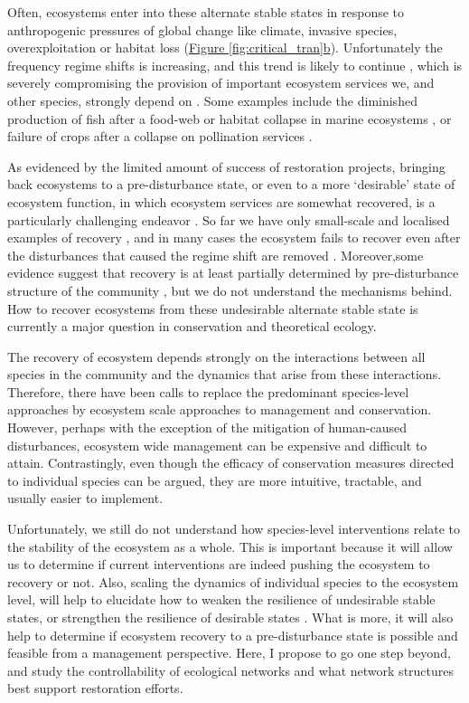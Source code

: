\documentclass[a4paper]{article}
\begin{document}
Often, ecosystems enter into these alternate stable states in response to anthropogenic pressures of global change like climate, invasive species, overexploitation or habitat loss (\hyperref[fig:critical_tran]{Figure \ref{fig:critical_tran}b}).
Unfortunately the frequency regime shifts is increasing, and this trend is likely to continue \autocite{Hughes2005}, which is severely compromising the provision of important ecosystem services we, and other species, strongly depend on \autocite{Hughes2013a}.
Some examples include the diminished production of fish after a food-web or habitat collapse in marine ecosystems \autocite{Hare2000, Daskalov2007, MacNeil2015}, or failure of crops after a collapse on pollination services \autocite{Pauw2007,Lever2014}.

As evidenced by the limited amount of success of restoration projects, bringing back ecosystems to a pre-disturbance state, or even to a more `desirable' state of ecosystem function, in which ecosystem services are somewhat recovered, is a particularly challenging endeavor \autocite{Graham2013a}.
So far we have only small-scale and localised examples of recovery \autocite{Carpenter2006a, Stockwell2009}, and in many cases the ecosystem fails to recover even after the disturbances that caused the regime shift are removed \autocite{Hughes2005}.
Moreover,some evidence suggest that recovery is at least partially determined by pre-disturbance structure of the community \autocite{Graham2015}, but we do not understand the mechanisms behind.
How to recover ecosystems from these undesirable alternate stable state is currently a major question in conservation and theoretical ecology.

The recovery of ecosystem depends strongly on the interactions between all species in the community and the dynamics that arise from these interactions.
Therefore, there have been calls to replace the predominant species-level approaches by ecosystem scale approaches to management and conservation.
However, perhaps with the exception of the mitigation of human-caused disturbances, ecosystem wide management can be expensive and difficult to attain.
Contrastingly, even though the efficacy of conservation measures directed to individual species can be argued, they are more intuitive, tractable, and usually easier to implement.

Unfortunately, we still do not understand how species-level interventions relate to the stability of the ecosystem as a whole.
This is important because it will allow us to determine if current interventions are indeed pushing the ecosystem to recovery or not.
Also, scaling the dynamics of individual species to the ecosystem level, will help to elucidate how to weaken the resilience of undesirable stable states, or strengthen the resilience of desirable states \autocite{Graham2013a}.
What is more, it will also help to determine if ecosystem recovery to a pre-disturbance state is possible and feasible from a management perspective.
Here, I propose to go one step beyond, and study the controllability of ecological networks and what network structures best support restoration efforts.
\end{document}
